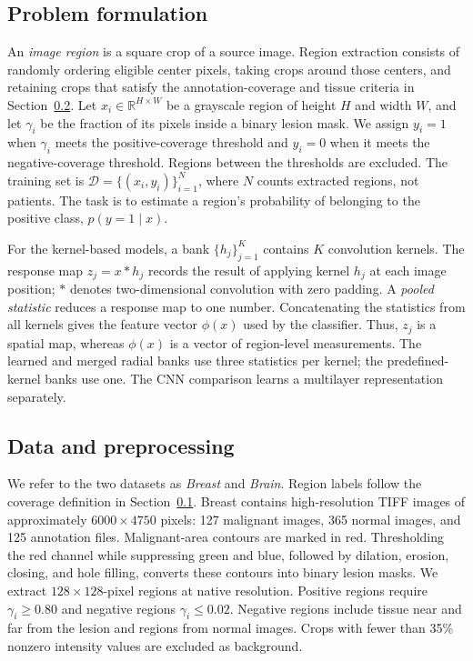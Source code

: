 \documentclass[10pt,twocolumn]{article}
\begin{document}
\subsection{Problem formulation}
\label{sec:problem}
An \emph{image region} is a square crop of a source image. Region extraction consists of randomly ordering eligible center pixels, taking crops around those centers, and retaining crops that satisfy the annotation-coverage and tissue criteria in Section~\ref{sec:data}. Let $x_i\in\mathbb{R}^{H\times W}$ be a grayscale region of height $H$ and width $W$, and let $\gamma_i$ be the fraction of its pixels inside a binary lesion mask. We assign $y_i=1$ when $\gamma_i$ meets the positive-coverage threshold and $y_i=0$ when it meets the negative-coverage threshold. Regions between the thresholds are excluded. The training set is $\mathcal D=\{(x_i,y_i)\}_{i=1}^{N}$, where $N$ counts extracted regions, not patients. The task is to estimate a region's probability of belonging to the positive class, $p(y=1\mid x)$.

For the kernel-based models, a bank $\{h_j\}_{j=1}^{K}$ contains $K$ convolution kernels. The response map $z_j=x*h_j$ records the result of applying kernel $h_j$ at each image position; $*$ denotes two-dimensional convolution with zero padding. A \emph{pooled statistic} reduces a response map to one number. Concatenating the statistics from all kernels gives the feature vector $\phi(x)$ used by the classifier. Thus, $z_j$ is a spatial map, whereas $\phi(x)$ is a vector of region-level measurements. The learned and merged radial banks use three statistics per kernel; the predefined-kernel banks use one. The CNN comparison learns a multilayer representation separately.

\subsection{Data and preprocessing}
\label{sec:data}
We refer to the two datasets as \emph{Breast} and \emph{Brain}. Region labels follow the coverage definition in Section~\ref{sec:problem}. Breast contains high-resolution TIFF images of approximately $6000\times4750$ pixels: 127 malignant images, 365 normal images, and 125 annotation files. Malignant-area contours are marked in red. Thresholding the red channel while suppressing green and blue, followed by dilation, erosion, closing, and hole filling, converts these contours into binary lesion masks. We extract $128\times128$-pixel regions at native resolution. Positive regions require $\gamma_i\geq0.80$ and negative regions $\gamma_i\leq0.02$. Negative regions include tissue near and far from the lesion and regions from normal images. Crops with fewer than 35\% nonzero intensity values are excluded as background.
\end{document}
